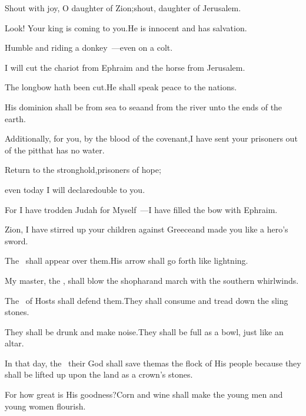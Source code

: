 
\begin{inparaenum}
  \pb{} Shout with joy, O daughter of Zion;\pa{}shout, daughter of Jerusalem.%

  \pb{}Look! Your king is coming to you.\pa{}He is innocent and has salvation.%

  \pb{}Humble and riding a donkey~---\pa{}even on a colt.%

  \pb{} I will cut the chariot from Ephraim%
  \pa{}and the horse from Jerusalem.%

  \pb{}The longbow hath been cut.\pa{}He shall speak peace to the nations.%

  \pb{}His dominion shall be from sea to sea\pa{}and from the river unto the ends of the earth.%

  \pa{} Additionally, for you, by the blood of the covenant,\pa{}I have sent your prisoners out of the pit\pa{}that has no water.%

  \pa{} Return to the stronghold,\pa{}prisoners of hope;%

  \pa{}even today I will declare\pa{}double to you.%

  \pa{} For I have trodden Judah for Myself~---\pa{}I have filled the bow with Ephraim.%

  \pa{}Zion, I have stirred up your children against Greece\pa{}and made you like a hero's sword.%

  \pa{} The \lord\ shall appear over them.\pa{}His arrow shall go forth like lightning.%

  \pa{}My master, the \lord, shall blow the shophar\pa{}and march with the southern whirlwinds.%

  \pa{} The \lord\ of Hosts shall defend them.\pa{}They shall consume and tread down the sling stones.%

  \pa{}They shall be drunk and make noise.\pa{}They shall be full as a bowl, just like an altar.%

  \pa{} In that day, the \lord\ their God shall save them\pa{}as the flock of His people because they shall be lifted up upon the land as a crown's stones.%

  \pa{} For how great is His goodness?\pa{}Corn and wine shall make the young men and young women flourish.%
\end{inparaenum}
